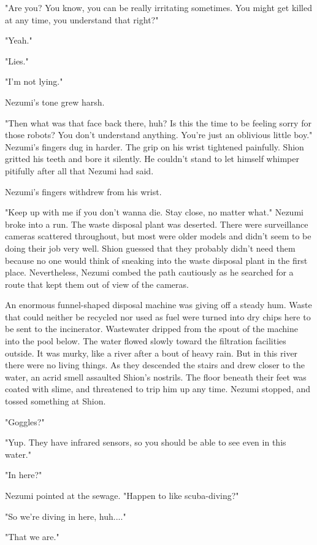 "Are you? You know, you can be really irritating sometimes. You might
get killed at any time, you understand that right?"

"Yeah."

"Lies."

"I'm not lying."

Nezumi's tone grew harsh.

"Then what was that face back there, huh? Is this the time to be feeling
sorry for those robots? You don't understand anything. You're just an
oblivious little boy." Nezumi's fingers dug in harder. The grip on his
wrist tightened painfully. Shion gritted his teeth and bore it silently.
He couldn't stand to let himself whimper pitifully after all that Nezumi
had said.

Nezumi's fingers withdrew from his wrist.

"Keep up with me if you don't wanna die. Stay close, no matter what."
Nezumi broke into a run. The waste disposal plant was deserted. There
were surveillance cameras scattered throughout, but most were older
models and didn't seem to be doing their job very well. Shion guessed
that they probably didn't need them because no one would think of
sneaking into the waste disposal plant in the first place. Nevertheless,
Nezumi combed the path cautiously as he searched for a route that kept
them out of view of the cameras.

An enormous funnel-shaped disposal machine was giving off a steady hum.
Waste that could neither be recycled nor used as fuel were turned into
dry chips here to be sent to the incinerator. Wastewater dripped from
the spout of the machine into the pool below. The water flowed slowly
toward the filtration facilities outside. It was murky, like a river
after a bout of heavy rain. But in this river there were no living
things. As they descended the stairs and drew closer to the water, an
acrid smell assaulted Shion's nostrils. The floor beneath their feet was
coated with slime, and threatened to trip him up any time. Nezumi
stopped, and tossed something at Shion.

"Goggles?"

"Yup. They have infrared sensors, so you should be able to see even in
this water."

"In here?"

Nezumi pointed at the sewage. "Happen to like scuba-diving?"

"So we're diving in here, huh...."

"That we are."


